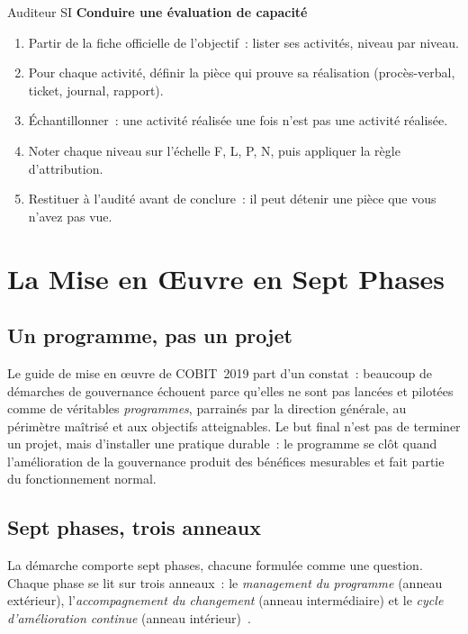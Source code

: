 \begin{boxmetier}{Auditeur SI}
\textbf{Conduire une évaluation de capacité}
\begin{enumerate}
    \item Partir de la fiche officielle de l'objectif~: lister ses
          activités, niveau par niveau.
    \item Pour chaque activité, définir la pièce qui prouve sa réalisation
          (procès-verbal, ticket, journal, rapport).
    \item Échantillonner~: une activité réalisée une fois n'est pas une
          activité réalisée.
    \item Noter chaque niveau sur l'échelle F, L, P, N, puis appliquer la
          règle d'attribution.
    \item Restituer à l'audité avant de conclure~: il peut détenir une pièce
          que vous n'avez pas vue.
\end{enumerate}
\end{boxmetier}

\section{La Mise en Œuvre en Sept Phases}
\label{sec:c08-phases}

\subsection{Un programme, pas un projet}

Le guide de mise en œuvre de COBIT~2019 part d'un constat~: beaucoup de
démarches de gouvernance échouent parce qu'elles ne sont pas lancées et
pilotées comme de véritables \emph{programmes}, parrainés par la direction
générale, au périmètre maîtrisé et aux objectifs atteignables. Le but final
n'est pas de terminer un projet, mais d'installer une pratique durable~:
le programme se clôt quand l'amélioration de la gouvernance produit des
bénéfices mesurables et fait partie du fonctionnement normal.

\subsection{Sept phases, trois anneaux}

La démarche comporte sept phases, chacune formulée comme une question.
Chaque phase se lit sur trois anneaux~: le \emph{management du programme}
(anneau extérieur), l'\emph{accompagnement du changement} (anneau
intermédiaire) et le \emph{cycle d'amélioration continue} (anneau
intérieur)~\cite{isaca2018cobitintro}.

